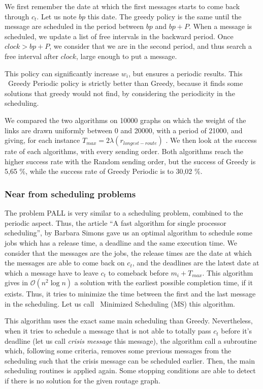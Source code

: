 \documentclass[a4paper,10pt]{article}
\begin{document}
     We first remember the date at which the first messages starts to come back through $c_t$. Let us note $bp$ this date.
     The greedy policy is the same until the message are scheduled in the period between $bp$ and $bp +P$. When a message is scheduled, we update a list of free intervals in the backward period.
     Once $clock > bp+P$, we consider that we are in the second period, and thus search a free interval after $clock$, large enough to put a message.
     
     This policy can significantly increase $w_i$, but ensures a periodic results. This {\ Greedy Periodic} policy is strictly better than Greedy, because it finds some solutions that greedy would not find, by considering the periodicity in the scheduling.
     
         We compared the two algorithms on 10000 graphs on which the weight of the links are drawn uniformly between 0 and 20000, with a period of 21000, and giving, for each instance $T_{max} = 2\lambda(r_{longest-route})$ . We then look at the success rate of each algorithms, with every sending order. Both algorithms reach the higher success rate with the Random sending order, but the success of Greedy is 5,65 \%, while the success rate of Greedy Periodic is to 30,02 \%.

    
     
     \subsubsection{Near from scheduling problems}
     
     The problem PALL is very similar to a scheduling problem, combined to the periodic aspect. Thus, the article ``A fast algorithm for single processor scheduling'', by Barbara Simons \cite{simons1978fast} gave us an optimal algorithm to schedule some jobs which has a release time, a deadline and the same execution time. We consider that the messages are the jobs, the release times are the date at which the messages are able to come back on $c_t$, and the deadlines are the latest date at which a message have to leave $c_t$ to comeback before $m_i + T_{max}$. This algorithm gives in $\mathcal{O}(n^2\log{}n)$ a solution with the earliest  possible completion time, if it exists. Thus, it tries to minimize the time between the first and the last message in the scheduling. Let us call {\ Minimized Scheduling (MS)} this algorithm.
     
     This algorithm uses the exact same main scheduling than Greedy. Nevertheless, when it tries to schedule a message that is not able to totally pass $c_t$ before it's deadline (let us call {\em crisis message} this message), the algorithm call a subroutine which, following some criteria, removes some previous messages from the scheduling such that the crisis message can be scheduled earlier. Then, the main scheduling routines is applied again. Some stopping conditions are able to detect if there is no solution for the given routage graph.
     
\end{document}
